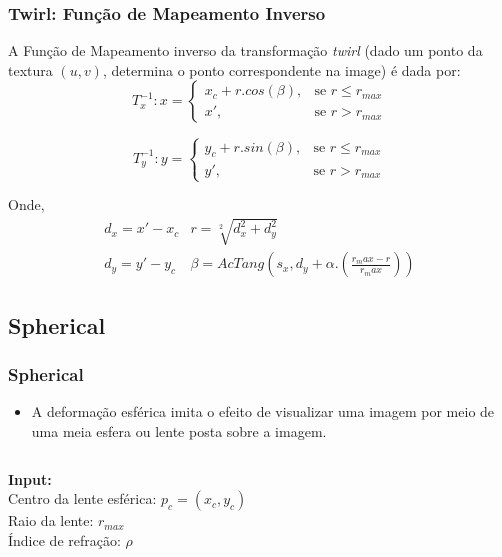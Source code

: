 \documentclass{beamer}
\begin{document}
\begin{frame}
\frametitle{Twirl: Função de Mapeamento Inverso}
A Função de Mapeamento inverso da transformação \textit{twirl} (dado um ponto da
textura $(u,v)$, determina o ponto correspondente na image) é dada por:
   \begin{equation}
    T_x^{-1}: x = 
\begin{cases}
 x_c + r.cos(\beta), & \text{se } r \leq r_{max}\\
 x', & \text{se } r > r_{max}
\end{cases}
   \end{equation}

\begin{equation}
    T_y^{-1}: y = 
\begin{cases}
 y_c + r.sin(\beta), & \text{se } r \leq r_{max} \\
 y', & \text{se } r > r_{max}
\end{cases}
\end{equation}

\pause
Onde,
\begin{equation}
\begin{array}{c|c}
d_x = x'- x_c & r = \sqrt[2]{d_x^2+d_y^2} \\
d_y =  y'- y_c & \beta = AcTang(s_x, d_y + \alpha.(\frac{r_max-r}{r_max}))
\end{array}
\end{equation}
\end{frame}

\subsection{Spherical}
\begin{frame}
 \frametitle{Spherical}
\begin{itemize}
 \item A deformação esférica imita o efeito de visualizar uma imagem por meio
de uma meia esfera ou lente posta sobre a imagem.
\end{itemize}
 
\begin{columns}[c]
\column{1.5in}
\textbf{Input:} \\
Centro da lente esférica: $p_c = (x_c, y_c)$ \\
Raio da lente: $r_{max}$ \\
Índice de refração: $\rho$
\column{1.5in}
\end{columns}
\end{frame}
\end{document}
